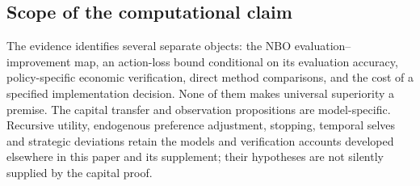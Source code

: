 \subsection{Scope of the computational claim}
The evidence identifies several separate objects: the NBO evaluation--improvement map, an action-loss bound conditional on its evaluation accuracy, policy-specific economic verification, direct method comparisons, and the cost of a specified implementation decision. None of them makes universal superiority a premise. The capital transfer and observation propositions are model-specific. Recursive utility, endogenous preference adjustment, stopping, temporal selves and strategic deviations retain the models and verification accounts developed elsewhere in this paper and its supplement; their hypotheses are not silently supplied by the capital proof.
